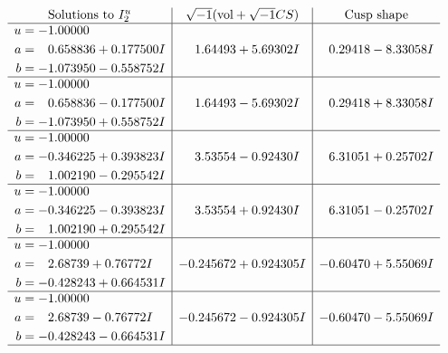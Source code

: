 \documentclass[1p]{elsarticle_modified}
\theoremstyle{definition}
\newcommand{\I}{\sqrt{-1}}
\begin{document}
$$\begin{array}{c|c|c}  
\text{Solutions to }I^u_{2}& \I (\text{vol} + \sqrt{-1}CS) & \text{Cusp shape}\\
 \hline 
\begin{aligned}
u &= -1.00000\phantom{ +0.000000I} \\
a &= \phantom{-}0.658836 + 0.177500 I \\
b &= -1.073950 - 0.558752 I\end{aligned}
 & \phantom{-}1.64493 + 5.69302 I & \phantom{-}0.29418 - 8.33058 I \\ \hline\begin{aligned}
u &= -1.00000\phantom{ +0.000000I} \\
a &= \phantom{-}0.658836 - 0.177500 I \\
b &= -1.073950 + 0.558752 I\end{aligned}
 & \phantom{-}1.64493 - 5.69302 I & \phantom{-}0.29418 + 8.33058 I \\ \hline\begin{aligned}
u &= -1.00000\phantom{ +0.000000I} \\
a &= -0.346225 + 0.393823 I \\
b &= \phantom{-}1.002190 - 0.295542 I\end{aligned}
 & \phantom{-}3.53554 - 0.92430 I & \phantom{-}6.31051 + 0.25702 I \\ \hline\begin{aligned}
u &= -1.00000\phantom{ +0.000000I} \\
a &= -0.346225 - 0.393823 I \\
b &= \phantom{-}1.002190 + 0.295542 I\end{aligned}
 & \phantom{-}3.53554 + 0.92430 I & \phantom{-}6.31051 - 0.25702 I \\ \hline\begin{aligned}
u &= -1.00000\phantom{ +0.000000I} \\
a &= \phantom{-}2.68739 + 0.76772 I \\
b &= -0.428243 + 0.664531 I\end{aligned}
 & -0.245672 + 0.924305 I & -0.60470 + 5.55069 I \\ \hline\begin{aligned}
u &= -1.00000\phantom{ +0.000000I} \\
a &= \phantom{-}2.68739 - 0.76772 I \\
b &= -0.428243 - 0.664531 I\end{aligned}
 & -0.245672 - 0.924305 I & -0.60470 - 5.55069 I\\
 \hline 
 \end{array}$$\newpage\newpage\renewcommand{\arraystretch}{1}
\end{document}
